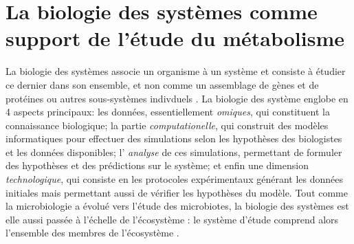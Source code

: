 \section{La biologie des systèmes comme support de l'étude du métabolisme}
La biologie des systèmes associe un organisme à un système et consiste à étudier ce dernier dans son ensemble, et non comme un assemblage de gènes et de protéines ou autres sous-systèmes indivduels \citep{Kitano2002}. La biologie des système englobe en 4 aspects principaux: les données, essentiellement \textit{omiques}, qui constituent la connaissance biologique; la partie \textit{computationelle}, qui construit des modèles informatiques pour effectuer des simulations selon les hypothèses des biologistes et les données disponibles;  l’ \textit{analyse} de ces simulations, permettant de formuler des hypothèses et des prédictions sur le système; et enfin une dimension  \textit{technologique}, qui consiste en les protocoles expérimentaux générant les données initiales mais permettant aussi de vérifier les hypothèses du modèle. Tout comme la microbiologie a évolué vers l'étude des microbiotes, la biologie des systèmes est elle aussi passée à l’échelle de l’écosystème : le système d'étude comprend alors l'ensemble des membres de l'écosystème \citep{osti_5545893}. 

